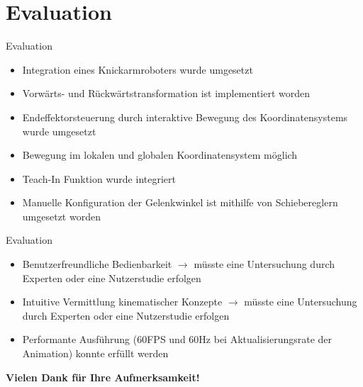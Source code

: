 \documentclass{beamer}
\begin{document}
\section{Evaluation}
\begin{frame}{Evaluation}
  \begin{itemize}
    \setlength{\itemsep}{1em}
    \item Integration eines Knickarmroboters wurde umgesetzt
    \item Vorwärts- und Rückwärtstransformation ist implementiert worden 
    \item Endeffektorsteuerung durch interaktive Bewegung des Koordinatensystems wurde umgesetzt
    \item Bewegung im lokalen und globalen Koordinatensystem möglich
    \item Teach-In Funktion wurde integriert
    \item Manuelle Konfiguration der Gelenkwinkel ist mithilfe von Schiebereglern umgesetzt worden
  \end{itemize}
\end{frame}



\begin{frame}{Evaluation}
  \begin{itemize}
    \setlength{\itemsep}{1em}
    \item Benutzerfreundliche Bedienbarkeit $\to$ müsste eine Untersuchung durch Experten oder eine Nutzerstudie erfolgen
    \item Intuitive Vermittlung kinematischer Konzepte $\to$ müsste eine Untersuchung durch Experten oder eine Nutzerstudie erfolgen
    \item Performante Ausführung (60FPS und 60Hz bei Aktualisierungsrate der Animation) konnte erfüllt werden
  \end{itemize}
\end{frame}





\begin{frame}{}
  \begin{center}
    \textbf{\huge Vielen Dank für Ihre Aufmerksamkeit!}  
  \end{center}
  
\end{frame}
\end{document}
